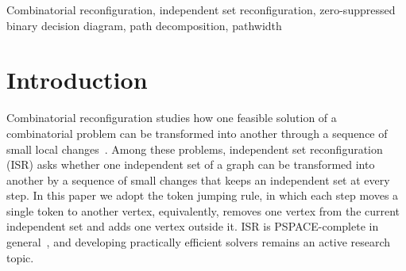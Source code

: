 \documentclass[conference]{IEEEtran}
\begin{document}
\begin{abstract}
Zero-suppressed binary decision diagrams (ZDDs) are a standard data structure for
compactly representing families of combinatorial solutions, and reducing the
width of the path decomposition used to construct a ZDD is known to be effective
for keeping it small.
In combinatorial reconfiguration, however, a ZDD-based solver must build a
solution-space ZDD and then repeatedly perform transition computations on top of
it, and how much this width affects the end-to-end performance of such solvers has
remained unclear.
This paper studies path decomposition as a preprocessing step for the ZDD-based
independent set reconfiguration (ISR) solver \textsc{ddreconf} under the token
jumping rule.
By reordering the input edges according to a computed path decomposition, we
shrink the solution-space ZDD and improve the overall performance of
\textsc{ddreconf}, without modifying the solver itself.
Computational experiments on two variants of the problem, the shortest and the
farthest variant, show that the preprocessing consistently reduces ZDD size,
memory usage, and running time, and increases the number of instances solved
within the time limit.
Moreover, computing an optimal path decomposition is unnecessary in practice: a
fast heuristic decomposition attains essentially the same width and the same
gains, and on large instances, for which the optimal pathwidth cannot be computed
in reasonable time, the heuristic is the only option that lets the solver reach
them.
\end{abstract}

\begin{IEEEkeywords}
Combinatorial reconfiguration, independent set reconfiguration, zero-suppressed binary decision diagram, path decomposition, pathwidth
\end{IEEEkeywords}

\section{Introduction}
Combinatorial reconfiguration studies how one feasible solution of a
combinatorial problem can be transformed into another through a sequence of small
local changes~\cite{nishimura18}.
Among these problems, independent set reconfiguration (ISR) asks whether one
independent set of a graph can be transformed into another by a sequence of small
changes that keeps an independent set at every step.
In this paper we adopt the token jumping rule, in which each step moves a single
token to another vertex, equivalently, removes one vertex from the current
independent set and adds one vertex outside it.
ISR is PSPACE-complete in general~\cite{kamemi12,itdehapasiueun11}, and developing
practically efficient solvers remains an active research topic.
\end{document}
